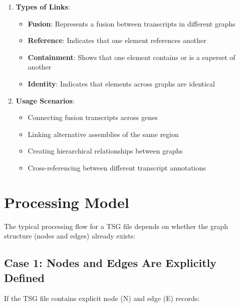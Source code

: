 \documentclass{article}
\begin{document}
\begin{enumerate}
	\item \textbf{Types of Links}:
	      \begin{itemize}
		      \item \textbf{Fusion}: Represents a fusion between transcripts in different graphs
		      \item \textbf{Reference}: Indicates that one element references another
		      \item \textbf{Containment}: Shows that one element contains or is a superset of another
		      \item \textbf{Identity}: Indicates that elements across graphs are identical
	      \end{itemize}

	\item \textbf{Usage Scenarios}:
	      \begin{itemize}
		      \item Connecting fusion transcripts across genes
		      \item Linking alternative assemblies of the same region
		      \item Creating hierarchical relationships between graphs
		      \item Cross-referencing between different transcript annotations
	      \end{itemize}
\end{enumerate}

\section{Processing Model}

The typical processing flow for a TSG file depends on whether the graph structure (nodes and edges) already exists:

\subsection{Case 1: Nodes and Edges Are Explicitly Defined}

If the TSG file contains explicit node (N) and edge (E) records:
\end{document}
